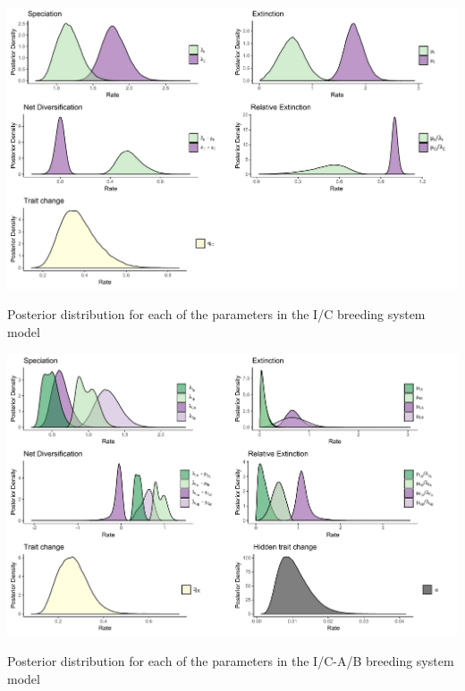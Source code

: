 \begin{suppfigure}
\includegraphics[width=\textwidth]{bisseSIposteriordist.pdf}
\caption{Posterior distribution for each of the parameters in the I/C breeding system model} %
\label{suppfigure:IC}
\end{suppfigure}

\begin{suppfigure}
\includegraphics[width=\textwidth]{hisseSInoretposteriordist.pdf}
\caption{Posterior distribution for each of the parameters in the I/C-A/B breeding system model} %
\label{suppfigure:ICAB}
\end{suppfigure}

